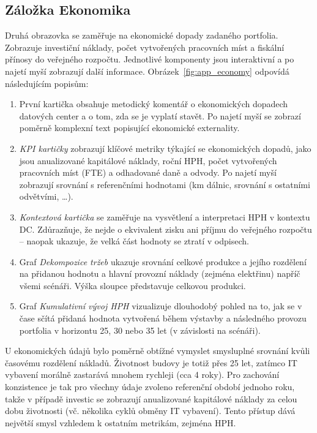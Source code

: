 \subsection{Záložka Ekonomika}
\label{subsec:app_ui_ekonomika}

Druhá obrazovka se zaměřuje na ekonomické dopady zadaného portfolia. Zobrazuje investiční náklady, počet vytvořených pracovních míst a fiskální přínosy do veřejného rozpočtu. Jednotlivé komponenty jsou interaktivní a po najetí myší zobrazují další informace. Obrázek~\ref{fig:app_economy} odpovídá následujícím popisům:

\begin{enumerate}
	
	\item První kartička obsahuje metodický komentář o ekonomických dopadech datových center a o tom, zda se je vyplatí stavět. Po najetí myší se zobrazí poměrně komplexní text popisující ekonomické externality.
	
	\item \textit{KPI kartičky} zobrazují klíčové metriky týkající se ekonomických dopadů, jako jsou anualizované kapitálové náklady, roční HPH, počet vytvořených pracovních míst (FTE) a odhadované daně a odvody. Po najetí myší zobrazují srovnání s referenčními hodnotami (km dálnic, srovnání s ostatními odvětvími, \dots{}).
	
	\item \textit{Kontextová kartička} se zaměřuje na vysvětlení a interpretaci HPH v kontextu DC. Zdůrazňuje, že nejde o ekvivalent zisku ani příjmu do veřejného rozpočtu -- naopak ukazuje, že velká část hodnoty se ztratí v odpisech. 
	
	\item Graf \textit{Dekompozice tržeb} ukazuje srovnání celkové produkce a jejího rozdělení na přidanou hodnotu a hlavní provozní náklady (zejména elektřinu) napříč všemi scénáři. Výška sloupce představuje celkovou produkci.
	
	\item Graf \textit{Kumulativní vývoj HPH} vizualizuje dlouhodobý pohled na to, jak se v čase sčítá přidaná hodnota vytvořená během výstavby a následného provozu portfolia v horizontu 25, 30 nebo 35 let (v závislosti na scénáři).

\end{enumerate}

U ekonomických údajů bylo poměrně obtížné vymyslet smysluplné srovnání kvůli časovému rozdělení nákladů. Životnost budovy je totiž přes 25 let, zatímco IT vybavení morálně zastarává mnohem rychleji (cca 4 roky). Pro zachování konzistence je tak pro všechny údaje zvoleno referenční období jednoho roku, takže v případě investic se zobrazují anualizované kapitálové náklady za celou dobu životnosti (vč. několika cyklů obměny IT vybavení). Tento přístup dává největší smysl vzhledem k ostatním metrikám, zejména HPH.

